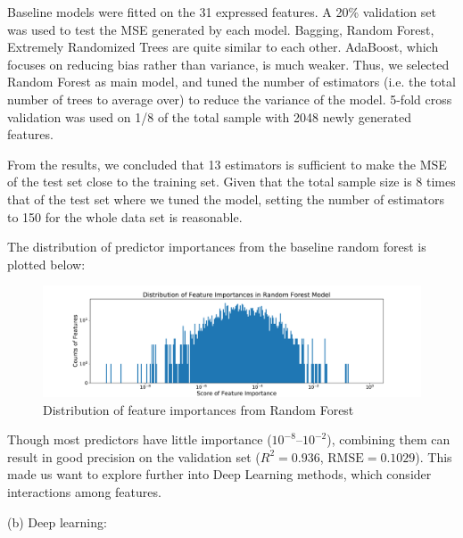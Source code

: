 \documentclass[11pt]{article}
\begin{document}
Baseline models were fitted on the 31 expressed features. A 20\% validation set was used to test the MSE generated by each model. Bagging, Random Forest, Extremely Randomized Trees are quite similar to each other. AdaBoost, which focuses on reducing bias rather than variance, is much weaker. Thus, we selected Random Forest as main model, and tuned the number of estimators (i.e. the total number of trees to average over) to reduce the variance of the model. 5-fold cross validation was used on 1/8 of the total sample with 2048 newly generated features. 

From the results, we concluded that 13 estimators is sufficient to make the MSE of the test set close to the training set. Given that the total sample size is 8 times that of the test set where we tuned the model, setting the number of estimators to 150 for the whole data set is reasonable.

The distribution of predictor importances from the baseline random forest is plotted below:

\begin{figure}[H]
\centering
\includegraphics[width=\textwidth]{his_feature_importance}
\caption{Distribution of feature importances from Random Forest}
\label{fig:his_feature_importance}
\end{figure}

Though most predictors have little importance ($10^{-8}$--$10^{-2}$), combining them can result in good precision on the validation set ($R^2 = 0.936$, $\textrm{RMSE}=0.1029$). This made us want to explore further into Deep Learning methods, which consider interactions among features.

(b) Deep learning: 

\end{document}
